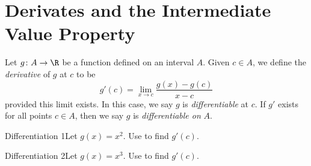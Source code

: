 \setcounter{section}{1}

\newcommand{\xtoc}{\lim_{x \to c}}

\section{Derivates and the Intermediate Value Property}

\begin{definition}
    Let \(g \colon A \to \R\) be a function defined on an interval \(A\). Given \(c \in A\), we define the \textit{derivative} of \(g\) at \(c\) to be
    \[
        g'(c) = \lim_{x \to c} \frac{g(x) - g(c)}{x - c}
    \]
    provided this limit exists. In this case, we say \(g\) is \textit{differentiable} at \(c\). If \(g'\) exists for all points \(c \in A\), then we say \(g\) is \textit{differentiable on} \(A\).
\end{definition}

\begin{example}
    {Differentiation 1}Let \(g(x) = x^{2}\). Use  to find \(g'(c)\).
\end{example}


\begin{example}
    {Differentiation 2}Let \(g(x) = x^{3}\). Use  to find \(g'(c)\).
\end{example}


